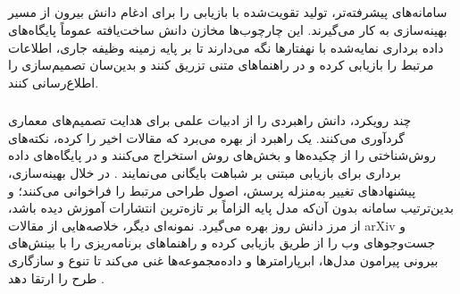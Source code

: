 
\subsection[دانش بیرونی: بازیابی از ادبیات و مخازن]{}

سامانه‌های پیشرفته‌تر، تولید تقویت‌شده با بازیابی را برای ادغام دانش بیرون از مسیر بهینه‌سازی به کار می‌گیرند. این چارچوب‌ها مخازن دانش ساخت‌یافته عموماً پایگاه‌های داده برداری نمایه‌شده با نهفتارها نگه می‌دارند تا بر پایه زمینه وظیفه جاری، اطلاعات مرتبط را بازیابی کرده و در راهنماهای متنی تزریق کنند و بدین‌سان تصمیم‌سازی را اطلاع‌رسانی کنند.

\subsubsection{\protect{}}

چند رویکرد، دانش راهبردی را از ادبیات علمی برای هدایت تصمیم‌های معماری گردآوری می‌کنند. یک راهبرد از  بهره می‌برد که مقالات اخیر را  کرده، نکته‌های روش‌شناختی را از چکیده‌ها و بخش‌های روش استخراج می‌کنند و در پایگاه‌های داده برداری برای بازیابی مبتنی بر شباهت بایگانی می‌نمایند \cite{Yang2025NADER}. در خلال بهینه‌سازی، پیشنهادهای تغییر به‌منزله پرسش، اصول طراحی مرتبط را فراخوانی می‌کنند؛ و بدین‌ترتیب سامانه بدون آن‌که مدل پایه الزاماً بر تازه‌ترین انتشارات آموزش دیده باشد، از مرز دانش روز بهره می‌گیرد. نمونه‌ای دیگر، خلاصه‌هایی از مقالات arXiv و جست‌وجوهای وب را از طریق  بازیابی کرده و راهنماهای برنامه‌ریزی را با بینش‌های بیرونی پیرامون مدل‌ها، ابرپارامترها و داده‌مجموعه‌ها غنی می‌کند تا تنوع و سازگاری طرح را ارتقا دهد \cite{trirat2025automlagent}.

